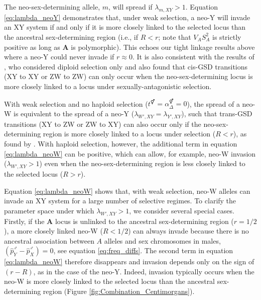 \documentclass[10pt,letterpaper]{article}
\begin{document}
The neo-sex-determining allele, $m$, will spread if $\lambda_{m,XY}>1$. 
Equation \eqref{eq:lambda_neoY} demonstrates that, under weak selection, a neo-Y will invade an XY system if and only if it is more closely linked to the selected locus than the ancestral sex-determining region (i.e., if $R<r$; note that $V_{A}S_{A}^2$ is strictly positive as long as \textbf{A} is polymorphic). 
This echoes our tight linkage results above where a neo-Y could never invade if $r\approx0$. It is also consistent with the results of \cite{vanDoorn:2007eu}, who considered diploid selection only and also found that cis-GSD transitions (XY to XY or ZW to ZW) can only occur when the neo-sex-determining locus is more closely linked to a locus under sexually-antagonistic selection. 

With weak selection and no haploid selection ($t^\Hermaphrodite=\alpha^\Hermaphrodite_{\Delta}=0$), the spread of a neo-W is equivalent to the spread of a neo-Y ($\lambda_{W',XY}=\lambda_{Y',XY}$), such that trans-GSD transitions (XY to ZW or ZW to XY) can also occur only if the neo-sex-determining region is more closely linked to a locus under selection ($R<r$), as found by \cite{vanDoorn:2010hu}. 
With haploid selection, however, the additional term in equation \eqref{eq:lambda_neoW} can be positive, which can allow, for example, neo-W invasion ($\lambda_{W',XY}>1$) even when the neo-sex-determining region is less closely linked to the selected locus ($R>r$). 

Equation \eqref{eq:lambda_neoW} shows that, with weak selection, neo-W alleles can invade an XY system for a large number of selective regimes. 
To clarify the parameter space under which $\lambda_{W',XY}>1$, we consider several special cases. 
Firstly, if the \textbf{A} locus is unlinked to the ancestral sex-determining region ($r=1/2$), a more closely linked neo-W ($R<1/2$) can always invade because there is no ancestral association between $A$ alleles and sex chromosomes in males, $\left( \hat{p}^\male_Y-\hat{p}^\male_X \right)=0$, see equation \eqref{eq:freq_diffs}. 
The second term in equation \eqref{eq:lambda_neoW} therefore disappears and invasion depends only on the sign of $(r-R)$, as in the case of the neo-Y. 
Indeed, invasion typically occurs when the neo-W is more closely linked to the selected locus than the ancestral sex-determining region (Figure \ref{fig:Combination_Centimorgans}).
\end{document}
